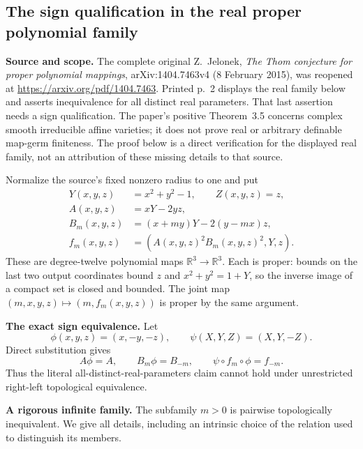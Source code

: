 \subsection*{The sign qualification in the real proper polynomial family}

\textbf{Source and scope.}\quad
The complete original Z.~Jelonek, \emph{The Thom conjecture for proper
polynomial mappings}, arXiv:1404.7463v4 (8 February 2015), was reopened
at \url{https://arxiv.org/pdf/1404.7463}. Printed p.~2 displays the real
family below and asserts inequivalence for all distinct real parameters.
That last assertion needs a sign qualification. The paper's positive
Theorem~3.5 concerns complex smooth irreducible affine varieties;
it does not prove real or arbitrary definable map-germ finiteness.
The proof below is a direct verification for the displayed real family,
not an attribution of these missing details to that source.

Normalize the source's fixed nonzero radius to one and put
\[
\begin{split}
 Y(x,y,z)&=x^2+y^2-1,\qquad Z(x,y,z)=z,\\
 A(x,y,z)&=xY-2yz,\\
 B_m(x,y,z)&=(x+my)Y-2(y-mx)z,\\
 f_m(x,y,z)&=(A(x,y,z)^2B_m(x,y,z)^2,Y,z).
\end{split}
\tag{J.1}
\]
These are degree-twelve polynomial maps $\mathbb R^3\to\mathbb R^3$.
Each is proper: bounds on the last two output coordinates bound $z$
and $x^2+y^2=1+Y$, so the inverse image of a compact set is closed and
bounded. The joint map $(m,x,y,z)\mapsto(m,f_m(x,y,z))$ is proper by
the same argument.

\textbf{The exact sign equivalence.}\quad
Let
\[
 \phi(x,y,z)=(x,-y,-z),\qquad
 \psi(X,Y,Z)=(X,Y,-Z).
\]
Direct substitution gives
\[
 A\phi=A,\qquad B_m\phi=B_{-m},\qquad
 \psi\circ f_m\circ\phi=f_{-m}.
\tag{J.2}
\]
Thus the literal all-distinct-real-parameters claim cannot hold under
unrestricted right-left topological equivalence.

\textbf{A rigorous infinite family.}\quad
The subfamily $m>0$ is pairwise topologically inequivalent. We give
all details, including an intrinsic choice of the relation used to
distinguish its members.

